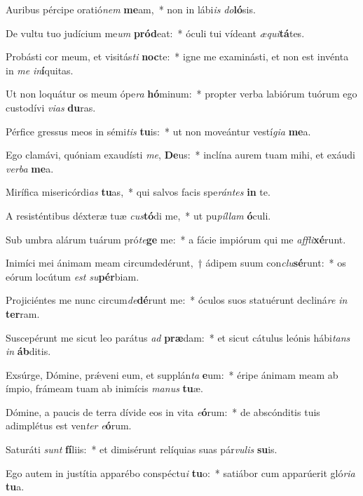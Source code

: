 \item Auribus pércipe oratió\textit{nem} \textbf{me}am,~* non in lábi\textit{is} \textit{do}\textbf{ló}sis.
\item De vultu tuo judícium me\textit{um} \textbf{pród}eat:~* óculi tui vídeant \textit{æ}\textit{qui}\textbf{tá}tes.
\item Probásti cor meum, et visitás\textit{ti} \textbf{noc}te:~* igne me examinásti, et non est invénta in \textit{me} \textit{in}\textbf{í}quitas.
\item Ut non loquátur os meum ópe\textit{ra} \textbf{hó}minum:~* propter verba labiórum tuórum ego custodívi \textit{vi}\textit{as} \textbf{du}ras.
\item Pérfice gressus meos in sémi\textit{tis} \textbf{tu}is:~* ut non moveántur vestí\textit{gi}\textit{a} \textbf{me}a.
\item Ego clamávi, quóniam exaudísti \textit{me}, \textbf{De}us:~* inclína aurem tuam mihi, et exáudi \textit{ver}\textit{ba} \textbf{me}a.
\item Mirífica misericórdi\textit{as} \textbf{tu}as,~* qui salvos facis spe\textit{rán}\textit{tes} \textbf{in} te.
\item A resisténtibus déxteræ tuæ \textit{cus}\textbf{tó}di me,~* ut pu\textit{píl}\textit{lam} \textbf{ó}culi.
\item Sub umbra alárum tuárum pró\textit{te}\textbf{ge} me:~* a fácie impiórum qui me \textit{af}\textit{fli}\textbf{xé}runt.
\item Inimíci mei ánimam meam circumdedérunt,~† ádipem suum con\textit{clu}\textbf{sé}runt:~* os eórum locútum \textit{est} \textit{su}\textbf{pér}biam.
\item Projiciéntes me nunc circum\textit{de}\textbf{dé}runt me:~* óculos suos statuérunt decliná\textit{re} \textit{in} \textbf{ter}ram.
\item Suscepérunt me sicut leo parátus \textit{ad} \textbf{præ}dam:~* et sicut cátulus leónis hábi\textit{tans} \textit{in} \textbf{áb}ditis.
\item Exsúrge, Dómine, prǽveni eum, et supplán\textit{ta} \textbf{e}um:~* éripe ánimam meam ab ímpio, frámeam tuam ab inimícis \textit{ma}\textit{nus} \textbf{tu}æ.
\item Dómine, a paucis de terra dívide eos in vita \textit{e}\textbf{ó}rum:~* de abscónditis tuis adimplétus est ven\textit{ter} \textit{e}\textbf{ó}rum.
\item Saturáti \textit{sunt} \textbf{fí}liis:~* et dimisérunt relíquias suas pár\textit{vu}\textit{lis} \textbf{su}is.
\item Ego autem in justítia apparébo conspéctu\textit{i} \textbf{tu}o:~* satiábor cum apparúerit gló\textit{ri}\textit{a} \textbf{tu}a.
